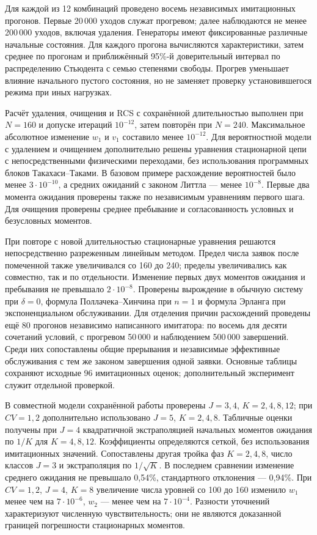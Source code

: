 \documentclass[a4paper,12pt]{article}
\begin{document}
Для каждой из 12 комбинаций проведено восемь независимых имитационных прогонов. Первые 20\,000 уходов служат прогревом; далее наблюдаются не менее 200\,000 уходов, включая удаления. Генераторы имеют фиксированные различные начальные состояния. Для каждого прогона вычисляются характеристики, затем среднее по прогонам и приближённый 95\%-й доверительный интервал по распределению Стьюдента с семью степенями свободы. Прогрев уменьшает влияние начального пустого состояния, но не заменяет проверку установившегося режима при иных нагрузках.

Расчёт удаления, очищения и RCS с сохранённой длительностью выполнен при \(N=160\) и допуске итераций \(10^{-12}\), затем повторён при \(N=240.\) Максимальное абсолютное изменение \(w_1\) и \(v_1\) составило менее \(10^{-12}.\) Для вероятностной модели с удалением и очищением дополнительно решены уравнения стационарной цепи с непосредственными физическими переходами, без использования программных блоков Такахаси--Таками. В базовом примере расхождение вероятностей было менее \(3\cdot10^{-10}\), а средних ожиданий с законом Литтла --- менее \(10^{-8}.\) Первые два момента ожидания проверены также по независимым уравнениям первого шага. Для очищения проверены среднее пребывание и согласованность условных и безусловных моментов.

При повторе с новой длительностью стационарные уравнения решаются непосредственно разреженным линейным методом. Предел числа заявок после помеченной также увеличивался со 160 до 240; пределы увеличивались как совместно, так и по отдельности. Изменение первых двух моментов ожидания и пребывания не превышало \(2\cdot10^{-8}.\) Проверены вырождение в обычную систему при \(\delta=0\), формула Поллачека--Хинчина при \(n=1\) и формула Эрланга при экспоненциальном обслуживании. Для отделения причин расхождений проведены ещё 80 прогонов независимо написанного имитатора: по восемь для десяти сочетаний условий, с прогревом 50\,000 и наблюдением 500\,000 завершений. Среди них сопоставлены общие прерывания и независимые эффективные обслуживания с тем же законом завершения одной заявки. Основные таблицы сохраняют исходные 96 имитационных оценок; дополнительный эксперимент служит отдельной проверкой.

В совместной модели сохранённой работы проверены \(J=3,4\), \(K=2,4,8,12\); при \(CV=1{,}2\) дополнительно использовано \(J=5\), \(K=2,4,8.\) Табличные оценки получены при \(J=4\) квадратичной экстраполяцией начальных моментов ожидания по \(1/K\) для \(K=4,8,12.\) Коэффициенты определяются сеткой, без использования имитационных значений. Сопоставлены другая тройка фаз \(K=2,4,8\), число классов \(J=3\) и экстраполяция по \(1/\sqrt K.\) В последнем сравнении изменение среднего ожидания не превышало 0{,}54\%, стандартного отклонения --- 0{,}94\%. При \(CV=1{,}2\), \(J=4\), \(K=8\) увеличение числа уровней со 100 до 160 изменило \(w_1\) менее чем на \(7\cdot10^{-6}\), \(w_2\) --- менее чем на \(7\cdot10^{-4}.\) Разности уточнений характеризуют численную чувствительность; они не являются доказанной границей погрешности стационарных моментов.
\end{document}
